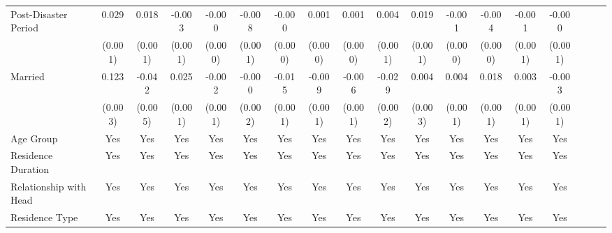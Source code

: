 \documentclass[serif, aspectratio=169]{beamer}
\begin{document}
\begin{frame}[label=different_types]
\begin{table}[htbp]
{\begin{tabular}{@{}l*{17}{c}@{}}
\addlinespace
Post-Disaster Period&    0.029\sym{***}&    0.018\sym{***}&   -0.003\sym{***}&   -0.000         &   -0.008\sym{***}&   -0.000         &    0.001\sym{***}&    0.001\sym{***}&    0.004\sym{***}&    0.019\sym{***}&   -0.001\sym{***}&   -0.004\sym{***}&   -0.001         &   -0.000         \\
          &  (0.001)         &  (0.001)         &  (0.001)         &  (0.000)         &  (0.001)         &  (0.000)         &  (0.000)         &  (0.000)         &  (0.001)         &  (0.001)         &  (0.000)         &  (0.000)         &  (0.001)         &  (0.001)         \\
\addlinespace
Married   &    0.123\sym{***}&   -0.042\sym{***}&    0.025\sym{***}&   -0.002\sym{***}&   -0.000         &   -0.015\sym{***}&   -0.009\sym{***}&   -0.006\sym{***}&   -0.029\sym{***}&    0.004         &    0.004\sym{***}&    0.018\sym{***}&    0.003\sym{***}&   -0.003\sym{**} \\
          &  (0.003)         &  (0.005)         &  (0.001)         &  (0.001)         &  (0.002)         &  (0.001)         &  (0.001)         &  (0.001)         &  (0.002)         &  (0.003)         &  (0.001)         &  (0.001)         &  (0.001)         &  (0.001)         \\
\addlinespace
Age Group &      Yes         &      Yes         &      Yes         &      Yes         &      Yes         &      Yes         &      Yes         &      Yes         &      Yes         &      Yes         &      Yes         &      Yes         &      Yes         &      Yes         \\
\addlinespace
Residence Duration &      Yes         &      Yes         &      Yes         &      Yes         &      Yes         &      Yes         &      Yes         &      Yes         &      Yes         &      Yes         &      Yes         &      Yes         &      Yes         &      Yes         \\
\addlinespace
Relationship with Head &      Yes         &      Yes         &      Yes         &      Yes         &      Yes         &      Yes         &      Yes         &      Yes         &      Yes         &      Yes         &      Yes         &      Yes         &      Yes         &      Yes         \\
\addlinespace
Residence Type &      Yes         &      Yes         &      Yes         &      Yes         &      Yes         &      Yes         &      Yes         &      Yes         &      Yes         &      Yes         &      Yes         &      Yes         &      Yes         &      Yes         \\

\end{tabular}}
\end{table}
\end{frame}
\end{document}
